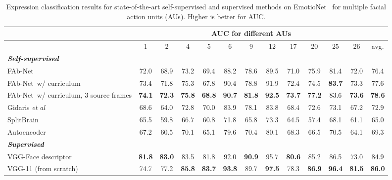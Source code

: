 \documentclass{bmvc2k}
\def\etal{\emph{et al}\bmvaOneDot}
\def\networkname{FAb-Net}
\begin{document}
\begin{table}
\scriptsize
\centering
\begin{tabular}{ | p{2cm} | c | c | c | c | c | c | c | c | c | c | c || c |}
\hline
 &  \multicolumn{11}{|c||}{AUC for different AUs} &\\ \hline
 & 1 & 2 & 4 & 5 & 6 & 9 & 12 & 17 & 20 & 25 & 26 & avg. \\ \hline 
 {\em \bf Self-supervised} & & & & & & & & & & & & \\
 \networkname~& {72.0} &  {68.9} &  {73.2} &  {69.4} &  {88.2} &  {78.6} &  {89.5} &  {71.0} &  {75.9} &  {81.4} &  {72.0} &  {76.4} \\ 
 \networkname~w/ curriculum& {73.4} &  {71.8} &  {75.3} &  {67.8} &  {90.4} &  {78.8} &  {91.9} &  {72.4} &  {74.5} &  {\bf 83.7} &  {73.3} &  {77.6} \\ 
 \networkname~w/ curriculum, 3 source frames & {\bf 74.1} &  {\bf 72.3} &  {\bf 75.8} &  {\bf 68.8} &  {\bf 90.7} &  {\bf 81.8} &  {\bf 92.5} &  {\bf 73.7} &  {\bf 77.2} &  {83.6} &  {\bf 73.6} &  {\bf 78.6} \\ \hline
 Gidaris \etal \cite{gidaris2018unsupervised} & 68.6 & 64.0 & 72.8 & 70.0 & 83.9 & 78.1 & 83.8 & 68.4 & 72.6 & 73.1 & 67.2 & 72.9 \\ 
 SplitBrain \cite{zhang2017split} & 65.5 & 59.8 & 66.7 & 60.8 & 71.8 & 65.8 & 73.3 & 64.5 & 57.4 & 68.1 & 61.1 & 65.0 \\
  Autoencoder & 67.2 & 60.5 & 70.1 & 65.1 & 79.6 & 70.4 & 80.1 & 68.3 & 66.5 & 70.5 & 64.1 & 69.3 \\ \hline \hline
  {\em \bf Supervised} & & & & & & & & & & & & \\
VGG-Face descriptor~\cite{Parkhi15} & {\bf 81.8} &  {\bf 83.0} &  {83.5} &  {81.8} &  {92.0} &  {\bf 90.9} &  {95.7} &  {\bf 80.6} &  {85.2} &  {86.5} &  {73.0} &  {84.9} \\ 
VGG-11 (from scratch) & 74.7 &  77.2 &  {\bf 85.8} &  {\bf 83.7} &  {\bf 93.8} &  89.7 &  {\bf 97.5} &  78.3 &  {\bf 86.9} &  {\bf 96.4} &  {\bf 81.5} &  {\bf 86.0} \\ \hline
\end{tabular}
\caption{Expression classification results for state-of-the-art self-supervised and supervised methods on EmotioNet~\cite{benitez2017emotionet} for multiple facial action units (AUs). Higher is better for AUC.}

\label{tab:emotionetresults}
\end{table}
\end{document}
